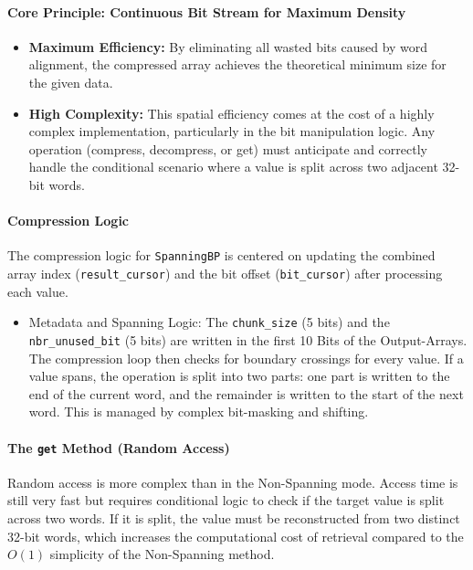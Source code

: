 \documentclass[11pt, a4paper]{article}
\begin{document}
	\paragraph{Core Principle: Continuous Bit Stream for Maximum Density}
	\begin{itemize}
		\item \textbf{Maximum Efficiency:} By eliminating all wasted bits caused by word alignment, the compressed array achieves the theoretical minimum size for the given data.
		\item \textbf{High Complexity:} This spatial efficiency comes at the cost of a highly complex implementation, particularly in the bit manipulation logic. Any operation (compress, decompress, or get) must anticipate and correctly handle the conditional scenario where a value is split across two adjacent 32-bit words.
	\end{itemize}
	
	\paragraph{Compression Logic}
	The compression logic for \texttt{SpanningBP} is centered on updating the combined array index (\texttt{result\_cursor}) and the bit offset (\texttt{bit\_cursor}) after processing each value.
	
	\begin{itemize}
		\item Metadata and Spanning Logic: The \texttt{chunk\_size} (5 bits) and the \texttt{nbr\_unused\_bit} (5 bits) are written in the first 10 Bits of the Output-Arrays. The compression loop then checks for boundary crossings for every value. If a value spans, the operation is split into two parts: one part is written to the end of the current word, and the remainder is written to the start of the next word. This is managed by complex bit-masking and shifting.
	\end{itemize}
	
	\paragraph{The \texttt{get} Method (Random Access)}
	Random access is more complex than in the Non-Spanning mode. Access time is still very fast but requires conditional logic to check if the target value is split across two words. If it is split, the value must be reconstructed from two distinct 32-bit words, which increases the computational cost of retrieval compared to the $O(1)$ simplicity of the Non-Spanning method.
	
\end{document}

